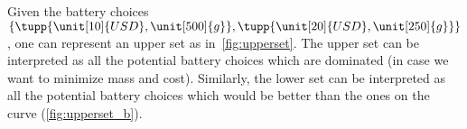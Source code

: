 \begin{marginfigure}
	\begin{center}
	\end{center}
	\caption{\label{fig:upperset_b}}
\end{marginfigure}

Given the battery choices~$\{\tupp{\unit[10]{USD},\unit[500]{g}},\tupp{\unit[20]{USD},\unit[250]{g}}\}$, one can represent an upper set as in~\cref{fig:upperset}.
The upper set can be interpreted as all the potential battery choices which are dominated (in case we want to minimize mass and cost).
Similarly, the lower set can be interpreted as all the potential battery choices which would be better than the ones on the curve (\cref{fig:upperset_b}).

%
